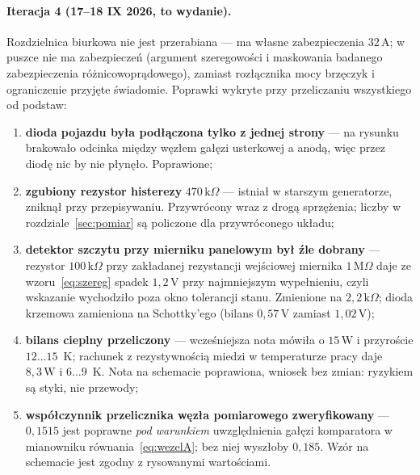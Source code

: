 \documentclass[a4paper,11pt]{article}
\newcommand{\kohm}{\,\mathrm{k}\Omega}
\newcommand{\Mohm}{\,\mathrm{M}\Omega}
\newcommand{\volt}{\,\mathrm{V}}
\newcommand{\amp}{\,\mathrm{A}}
\newcommand{\watt}{\,\mathrm{W}}
\begin{document}
\paragraph{Iteracja 4 (17--18 IX 2026, to wydanie).} Rozdzielnica biurkowa nie jest
przerabiana --- ma własne zabezpieczenia $32\amp$; w puszce nie ma zabezpieczeń
(argument szeregowości i maskowania badanego zabezpieczenia
różnicowoprądowego), zamiast rozłącznika mocy brzęczyk i ograniczenie przyjęte
świadomie. Poprawki wykryte przy przeliczaniu wszystkiego od podstaw:

\begin{enumerate}
\item \textbf{dioda pojazdu była podłączona tylko z jednej strony} --- na rysunku
      brakowało odcinka między węzłem gałęzi usterkowej a anodą, więc przez diodę
      nic by nie płynęło. Poprawione;
\item \textbf{zgubiony rezystor histerezy} $470\kohm$ --- istniał w starszym
      generatorze, zniknął przy przepisywaniu. Przywrócony wraz z drogą sprzężenia;
      liczby w rozdziale~\ref{sec:pomiar} są policzone dla przywróconego układu;
\item \textbf{detektor szczytu przy mierniku panelowym był źle dobrany} ---
      rezystor $100\kohm$ przy zakładanej rezystancji wejściowej miernika $1\Mohm$
      daje ze wzoru~\eqref{eq:szereg} spadek $1{,}2\volt$ przy najmniejszym
      wypełnieniu, czyli wskazanie wychodziło poza okno tolerancji stanu.
      Zmienione na $2{,}2\kohm$; dioda krzemowa zamieniona na Schottky'ego
      (bilans $0{,}57\volt$ zamiast $1{,}02\volt$);
\item \textbf{bilans cieplny przeliczony} --- wcześniejsza nota mówiła
      o $15\watt$ i przyroście $12\ldots15$~K; rachunek z rezystywnością miedzi
      w temperaturze pracy daje $8{,}3\watt$ i $6\ldots9$~K. Nota na schemacie
      poprawiona, wniosek bez zmian: ryzykiem są styki, nie przewody;
\item \textbf{współczynnik przelicznika węzła pomiarowego zweryfikowany} ---
      $0{,}1515$ jest poprawne \emph{pod warunkiem} uwzględnienia gałęzi
      komparatora w mianowniku równania~\eqref{eq:wezelA}; bez niej wyszłoby
      $0{,}185$. Wzór na schemacie jest zgodny z rysowanymi wartościami.
\end{enumerate}
\end{document}

